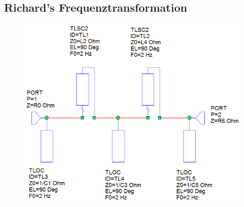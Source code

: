\subsection{Richard's Frequenztransformation}

\begin{figure}
    \centering
    \includegraphics[width=\imagewidth]{images/stripline-richards}
    \caption{}
\end{figure}


